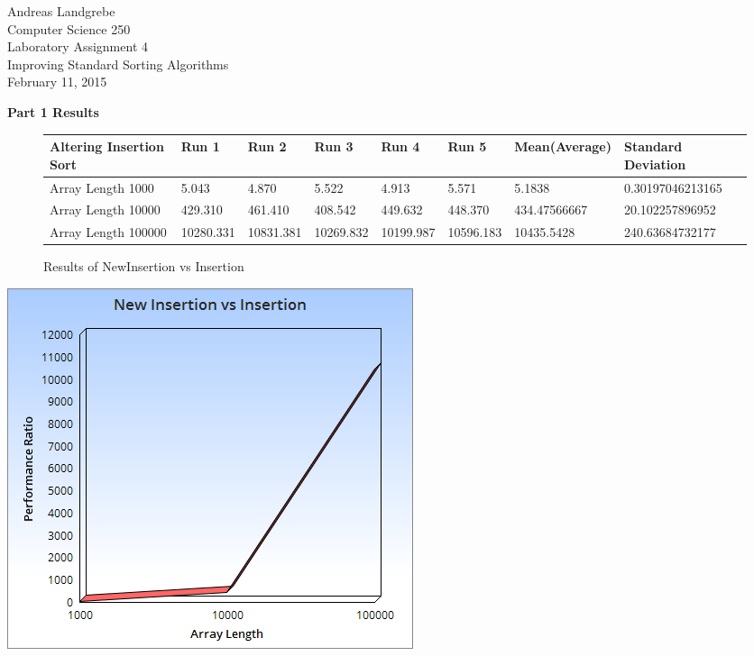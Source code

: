 \documentclass{article}
\begin{document}
\begin{center}
Andreas Landgrebe \\
Computer Science 250 \\
Laboratory Assignment 4 \\
Improving Standard Sorting Algorithms \\
February 11, 2015 \\
\end{center}
\newpage
\begin{center}
\textbf{Part 1 Results}
\end{center}

\begin{figure}[H]
\centering
\begin{adjustwidth}{-3.4cm}{}
\begin{tabular}{| l | l | l | l | l | l | l | l |}
\hline
Altering Insertion Sort & Run 1 & Run 2 & Run 3 & Run 4 & Run 5 & Mean(Average) & Standard Deviation\\ \hline
Array Length 1000 & 5.043 & 4.870 & 5.522 & 4.913 & 5.571 & 5.1838 & 0.30197046213165 \\ \hline
Array Length 10000 & 429.310 & 461.410 & 408.542 & 449.632 & 448.370 & 434.47566667 & 20.102257896952 \\ \hline
Array Length 100000 & 10280.331 & 10831.381  & 10269.832 & 10199.987 & 10596.183  & 10435.5428 & 240.63684732177 \\ \hline
\end{tabular}
\caption{Results of NewInsertion vs Insertion}
\end{adjustwidth}
\end{figure}

\includegraphics[scale=0.75]{NewInsertion.png}
\end{document}
